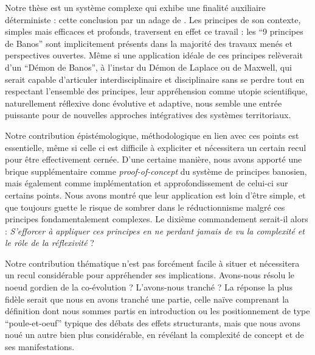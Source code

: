 


Notre thèse est un système complexe qui exhibe une finalité auxiliaire déterministe : cette conclusion par un adage de . Les principes de son contexte, simples mais efficaces et profonds, traversent en effet ce travail : les ``9 principes de Banos'' sont implicitement présents dans la majorité des travaux menés et perspectives ouvertes. Même si une application idéale de ces principes relèverait d'un ``Démon de Banos'', à l'instar du Démon de Laplace ou de Maxwell, qui serait capable d'articuler interdisciplinaire et disciplinaire sans se perdre tout en respectant l'ensemble des principes, leur appréhension comme utopie scientifique, naturellement réflexive donc évolutive et adaptive, nous semble une entrée puissante pour de nouvelles approches intégratives des systèmes territoriaux. 


Notre contribution épistémologique, méthodologique en lien avec ces points est essentielle, même si celle ci est difficile à expliciter et nécessitera un certain recul pour être effectivement cernée. D'une certaine manière, nous avons apporté une brique supplémentaire comme \emph{proof-of-concept} du système de principes banosien, mais également comme implémentation et approfondissement de celui-ci sur certains points. Nous avons montré que leur application est loin d'être simple, et que toujours guette le risque de sombrer dans le réductionnisme malgré ces principes fondamentalement complexes. Le dixième commandement serait-il alors : \textit{S'efforcer à appliquer ces principes en ne perdant jamais de vu la complexité et le rôle de la réflexivité} ?


Notre contribution thématique n'est pas forcément facile à situer et nécessitera un recul considérable pour appréhender ses implications. Avons-nous résolu le noeud gordien de la co-évolution ? L'avons-nous tranché ? La réponse la plus fidèle serait que nous en avons tranché une partie, celle naïve comprenant la définition dont nous sommes partis en introduction ou les positionnement de type ``poule-et-oeuf'' typique des débats des effets structurants, mais que nous avons noué un autre bien plus considérable, en révélant la complexité de concept et de ses manifestations.


